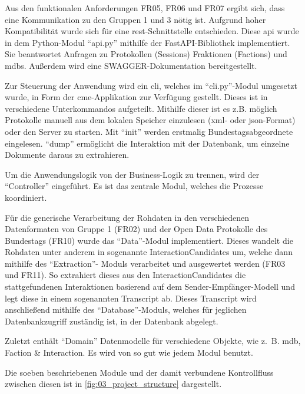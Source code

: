 Aus den funktionalen Anforderungen FR05, FR06 und FR07 ergibt sich, dass eine
Kommunikation zu den Gruppen 1 und 3 nötig ist. Aufgrund hoher Kompatibilität
wurde sich für eine \gls{rest}-Schnittstelle entschieden. Diese \gls{api} wurde in dem
Python-Modul \enquote{api.py} mithilfe der FastAPI-Bibliothek implementiert. Sie
beantwortet Anfragen zu Protokollen (Sessions) Fraktionen (Factions) und
\glspl{mdb}. Außerdem wird eine SWAGGER-Dokumentation
bereitgestellt.

Zur Steuerung der Anwendung wird ein \gls{cli}, welches im \enquote{cli.py}-Modul umgesetzt
wurde, in Form der \gls{cme}-Applikation zur Verfügung gestellt. Dieses ist in
verschiedene Unterkommandos aufgeteilt. Mithilfe dieser ist es z.B. möglich
Protokolle manuell aus dem lokalen Speicher einzulesen (\gls{xml}- oder \gls{json}-Format)
oder den Server zu starten. Mit \enquote{init} werden erstmalig Bundestagsabgeordnete
eingelesen. \enquote{dump} ermöglicht die Interaktion mit der Datenbank, um einzelne
Dokumente daraus zu extrahieren.

Um die Anwendungslogik von der Business-Logik zu trennen, wird der \enquote{Controller}
eingeführt. Es ist das zentrale Modul, welches die Prozesse koordiniert.

Für die generische Verarbeitung der Rohdaten in den verschiedenen Datenformaten
von Gruppe 1 (FR02) und der Open Data Protokolle des Bundestags (FR10) wurde
das \enquote{Data}-Modul implementiert. Dieses wandelt die Rohdaten unter anderem in
sogenannte InteractionCandidates um, welche dann mithilfe des \enquote{Extraction}-
Moduls verarbeitet und ausgewertet werden (FR03 und FR11). So extrahiert dieses
aus den InteractionCandidates die stattgefundenen Interaktionen basierend auf
dem Sender-Empfänger-Modell und legt diese in einem sogenannten Transcript ab.
Dieses Transcript wird anschließend mithilfe des \enquote{Database}-Moduls, welches für
jeglichen Datenbankzugriff zuständig ist, in der Datenbank abgelegt.

Zuletzt enthält \enquote{Domain} Datenmodelle für verschiedene Objekte, wie z.~B. \gls{mdb},
Faction \& Interaction. Es wird von so gut wie jedem Modul benutzt.

Die soeben beschriebenen Module und der damit verbundene Kontrollfluss zwischen
diesen ist in \autoref{fig:03_project_structure} dargestellt.

